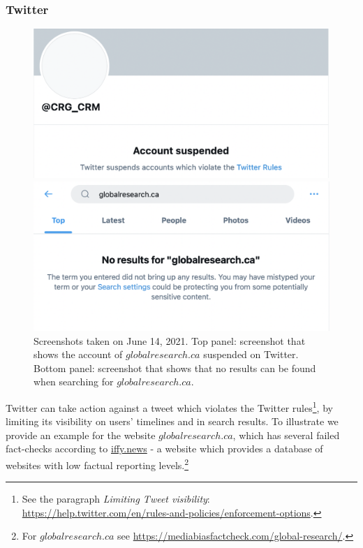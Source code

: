 \documentclass{article}
\begin{document}
\subsubsection{Twitter} 

\begin{figure}
	\centering
		\begin{multicols}{1}	
			\includegraphics[scale=0.35]{./img/globalresearch_2021-06-14.png}
		\end{multicols}
		
		\begin{multicols}{1}
			\includegraphics[scale=0.35]{./img/globalresearch_14_06_2021_16pm_UTC.png} 
		\end{multicols}
		\caption{Screenshots taken on June 14, 2021. Top panel: screenshot that shows the account of $globalresearch.ca$ suspended on Twitter. Bottom panel: screenshot that shows that no results can be found when searching for $globalresearch.ca$.    }
		\label{fig3}
\end{figure}

Twitter can take action against a tweet which violates the Twitter rules\footnote{See the paragraph {\it Limiting Tweet visibility}: \href{https://help.twitter.com/en/rules-and-policies/enforcement-options}{https://help.twitter.com/en/rules-and-policies/enforcement-options}.}, by limiting its visibility on users' timelines and in search results. To illustrate we provide an example for the website $globalresearch.ca$, which has several failed fact-checks according to \href{https://iffy.news}{iffy.news} - a website which provides a database of websites with low factual reporting levels.\footnote{For $globalresearch.ca$ see \href{https://mediabiasfactcheck.com/global-research/}{https://mediabiasfactcheck.com/global-research/}.}
\end{document}
